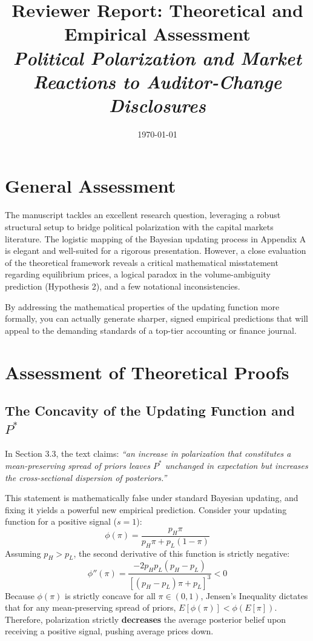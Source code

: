 \documentclass[12pt]{article}
\title{Reviewer Report: Theoretical and Empirical Assessment\\
\large \textit{Political Polarization and Market Reactions to Auditor-Change Disclosures}}
\date{\today}
\begin{document}
\maketitle
\onehalfspacing

\section{General Assessment}
The manuscript tackles an excellent research question, leveraging a robust structural setup to bridge political polarization with the capital markets literature. The logistic mapping of the Bayesian updating process in Appendix A is elegant and well-suited for a rigorous presentation. However, a close evaluation of the theoretical framework reveals a critical mathematical misstatement regarding equilibrium prices, a logical paradox in the volume-ambiguity prediction (Hypothesis 2), and a few notational inconsistencies. 

By addressing the mathematical properties of the updating function more formally, you can actually generate sharper, signed empirical predictions that will appeal to the demanding standards of a top-tier accounting or finance journal.

\section{Assessment of Theoretical Proofs}

\subsection{The Concavity of the Updating Function and $P^*$}
In Section 3.3, the text claims: \textit{``an increase in polarization that constitutes a mean-preserving spread of priors leaves $P^*$ unchanged in expectation but increases the cross-sectional dispersion of posteriors.''}

This statement is mathematically false under standard Bayesian updating, and fixing it yields a powerful new empirical prediction. 
Consider your updating function for a positive signal ($s=1$):
$$ \phi(\pi) = \frac{p_H \pi}{p_H \pi + p_L(1-\pi)} $$
Assuming $p_H > p_L$, the second derivative of this function is strictly negative:
$$ \phi''(\pi) = \frac{-2 p_H p_L (p_H - p_L)}{[(p_H - p_L) \pi + p_L]^3} < 0 $$
Because $\phi(\pi)$ is strictly concave for all $\pi \in (0,1)$, Jensen's Inequality dictates that for any mean-preserving spread of priors, $E[\phi(\pi)] < \phi(E[\pi])$. Therefore, polarization strictly \textbf{decreases} the average posterior belief upon receiving a positive signal, pushing average prices down. 
\end{document}
